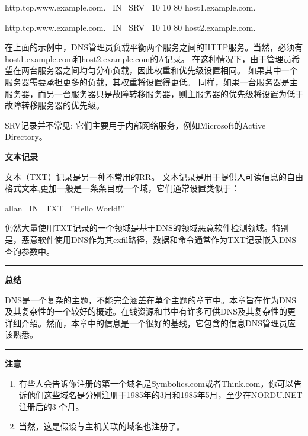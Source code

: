 ﻿\documentclass[english,runningheads,a4paper]{llncs}[2018/03/10]
\begin{document}
\par\setlength\parindent{2em}http.tcp.www.example.com. \ IN \ SRV \ 10 10 80 host1.example.com.

\par\setlength\parindent{2em}http.tcp.www.example.com. \ IN \ SRV \ 10 10 80 host2.example.com.


\par\setlength\parindent{2em}在上面的示例中，DNS管理员负载平衡两个服务之间的HTTP服务。当然，必须有host1.example.com和host2.example.com的A记录。 在这种情况下，由于管理员希望在两台服务器之间均匀分布负载，因此权重和优先级设置相同。 如果其中一个服务器需要承担更多的负载，其权重将设置得更低。 同样，如果一台服务器是主服务器，而另一台服务器只是故障转移服务器，则主服务器的优先级将设置为低于故障转移服务器的优先级。

\par\setlength\parindent{2em}SRV记录并不常见; 它们主要用于内部网络服务，例如Microsoft的Active Directory。

\vbox{}

\par\noindent\textbf{文本记录}

\par\noindent 文本（TXT）记录是另一种不常用的RR。 文本记录是用于提供人可读信息的自由格式文本,更加一般是一条条目或一个域，它们通常设置类似于：

\par\setlength\parindent{2em}allan \ IN \ TXT \ ”Hello World!”

\par\setlength\parindent{2em}仍然大量使用TXT记录的一个领域是基于DNS的领域恶意软件检测领域。特别是，恶意软件使用DNS作为其exfil路径，数据和命令通常作为TXT记录嵌入DNS查询参数中。

\vbox{}

\par\noindent\rule[0.25\baselineskip]{\textwidth}{1pt} %
\par\noindent\textbf{总结}
\par\setlength\parindent{2em}DNS是一个复杂的主题，不能完全涵盖在单个主题的章节中。本章旨在作为DNS及其复杂性的一个较好的概述。在线资源和书中有许多可供DNS及其复杂性的更详细介绍。然而，本章中的信息是一个很好的基线，它包含的信息DNS管理员应该熟悉。

\vbox{}

\par\noindent\rule[0.25\baselineskip]{\textwidth}{2pt} %
\par\noindent\textbf{注意}
\begin{enumerate}
\item 有些人会告诉你注册的第一个域名是Symbolics.com或者Think.com，你可以告诉他们这些域名是分别注册于1985年的3月和1985年5月，至少在NORDU.NET注册后的3 个月。
\item 当然，这是假设与主机关联的域名也注册了。
\end{enumerate}
\end{document}

